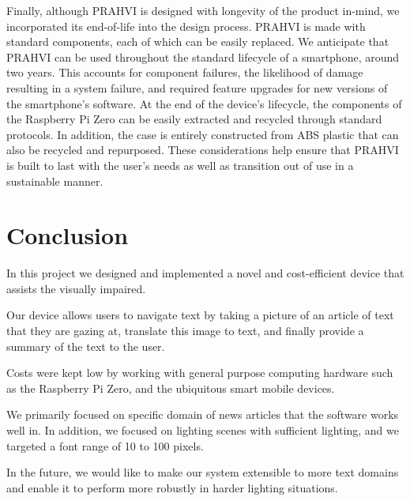 	Finally, although PRAHVI is designed with longevity of the product in-mind, we incorporated its end-of-life into the design process. PRAHVI is made with standard components, each of which can be easily replaced. We anticipate that PRAHVI can be used throughout the standard lifecycle of a smartphone, around two years. This accounts for component failures, the likelihood of damage resulting in a system failure, and required feature upgrades for new versions of the smartphone's software. At the end of the device's lifecycle, the components of the Raspberry Pi Zero can be easily extracted and recycled through standard protocols. In addition, the case is entirely constructed from ABS plastic that can also be recycled and repurposed. These considerations help ensure that PRAHVI is built to last with the user's needs as well as transition out of use in a sustainable manner.

\chapter{Conclusion}
In this project we designed and implemented a novel and cost-efficient device that assists the visually impaired. 

Our device allows users to navigate text by taking a picture of an article of text that they are gazing at, translate this image to text, and finally provide a summary of the text to the user. 

Costs were kept low by working with general purpose computing hardware such as the Raspberry Pi Zero, and the ubiquitous smart mobile devices.

We primarily focused on specific domain of news articles that the software works well in. In addition, we focused on lighting scenes with sufficient lighting, and we targeted a font range of 10 to 100 pixels.

In the future, we would like to make our system extensible to more text domains and enable it to perform more robustly in harder lighting situations.